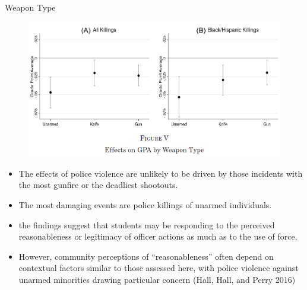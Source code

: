 \documentclass[dvipdfmx]{beamer}
\begin{document}
\begin{frame}{Weapon Type}
  \begin{figure}
    \centering
    \includegraphics[scale = .55]{fig_tab/os20220113/F5}
  \end{figure}
\end{frame}

\begin{frame}{}
  \begin{itemize}
    \item The effects of police violence are unlikely to be driven by those incidents with the most gunfire or the deadliest shootouts.
    \item The most damaging events are police killings of unarmed individuals.
    \item the findings suggest that students may be responding to the perceived reasonableness or legitimacy of officer actions as much as to the use of force.
    \item However, community perceptions of “reasonableness” often depend on contextual factors similar to those assessed here, with police violence against unarmed minorities drawing particular concern (Hall, Hall, and Perry 2016)
  \end{itemize}
\end{frame}
\end{document}
